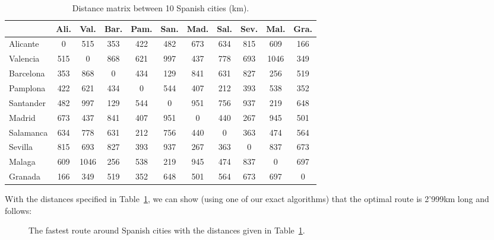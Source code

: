 \begin{table}[hbt]
\begin{center}
\begin{tabular}{|l|cccccccccc|}
\cline{2-11}
\multicolumn{1}{c|}{} & Ali.   & Val.  & Bar. & Pam. & San. & Mad. & Sal. & Sev. & Mal.  & Gra. \\
\hline 
Alicante	& 0   & 515  & 353 & 422 & 482 & 673 & 634 & 815 & 609  & 166 \\
Valencia    & 515 & 0    & 868 & 621 & 997 & 437 & 778 & 693 & 1046 & 349 \\
Barcelona	& 353 & 868  & 0   & 434 & 129 & 841 & 631 & 827 & 256  & 519 \\
Pamplona	& 422 & 621  & 434 & 0   & 544 & 407 & 212 & 393 & 538  & 352 \\
Santander	& 482 & 997  & 129 & 544 & 0   & 951 & 756 & 937 & 219  & 648 \\
Madrid		& 673 & 437  & 841 & 407 & 951 & 0   & 440 & 267 & 945  & 501 \\
Salamanca	& 634 & 778  & 631 & 212 & 756 & 440 & 0   & 363 & 474  & 564 \\
Sevilla		& 815 & 693  & 827 & 393 & 937 & 267 & 363 & 0   & 837  & 673 \\
Malaga		& 609 & 1046 & 256 & 538 & 219 & 945 & 474 & 837 & 0    & 697 \\
Granada		& 166 & 349  & 519 & 352 & 648 & 501 & 564 & 673 & 697  & 0   \\
\hline 
\end{tabular}
\caption{Distance matrix between 10 Spanish cities (km).}
\label{tab:distance_matrix}
\end{center}
\end{table}	

With the distances specified in Table~\ref{tab:distance_matrix}, we can show (using one of our exact algorithms) that the optimal route is 2'999\:km long and follows:\\

\begin{figure}[htb]
\begin{center}
\caption{The fastest route around Spanish cities with the distances given in Table~\ref{tab:distance_matrix}.}
\label{fig:fastest_route_around_spannish_cities}
\end{center}
\end{figure}
\clearpage
